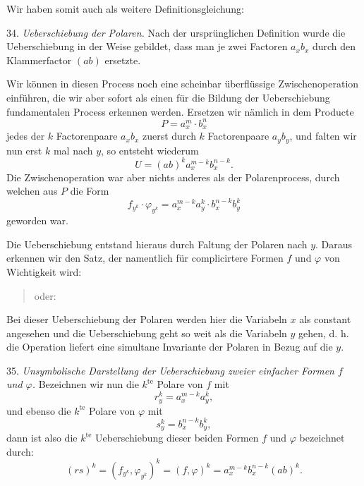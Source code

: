 
Wir haben somit auch als weitere Definitionsgleichung:


34. \textit{Ueberschiebung der Polaren.} Nach der ursprünglichen Definition
wurde die Ueberschiebung in der Weise gebildet, dass man je zwei Factoren
$a_x b_x$ durch den Klammerfactor $(ab)$ ersetzte.

Wir können in diesen Process noch eine scheinbar überflüssige
Zwischenoperation einführen, die wir aber sofort als einen für die
Bildung der Ueberschiebung fundamentalen Process erkennen werden.
Ersetzen wir nämlich in dem Producte
\[
P = a_x^m \cdot b_x^n
\]
jedes der $k$ Factorenpaare $a_x b_x$ zuerst durch $k$ Factorenpaare
$a_y b_y$, und falten wir nun erst $k$ mal nach $y$, so entsteht wiederum
\[
U = (ab)^k a_x^{m-k} b_x^{n-k}.
\]
Die Zwischenoperation war aber nichts anderes als der Polarenprocess,
durch welchen aus $P$ die Form
\[
f_{y^k} \cdot \varphi_{y^k} = a_x^{m-k} a_y^k \cdot b_x^{n-k} b_y^k
\]
geworden war.

Die Ueberschiebung entstand hieraus durch Faltung der Polaren nach $y$.
Daraus erkennen wir den Satz, der namentlich für complicirtere Formen $f$
und $\varphi$ von Wichtigkeit wird:

\begin{quote}
\glqq {}\grqq{}
oder:
\end{quote}


Bei dieser Ueberschiebung der Polaren werden hier die Variabeln $x$ als
constant angesehen und die Ueberschiebung geht so weit als die Variabeln
$y$ gehen, d. h. die Operation liefert eine simultane Invariante der
Polaren in Bezug auf die $y$.

35. \textit{Unsymbolische Darstellung der Ueberschiebung zweier einfacher
Formen $f$ und $\varphi$.} Bezeichnen wir nun die $k^{\text{te}}$ Polare
von $f$ mit
\[
r_y^k = a_x^{m-k} a_y^k,
\]
und ebenso die $k^{\text{te}}$ Polare von $\varphi$ mit
\[
s_y^k = b_x^{n-k} b_y^k,
\]
dann ist also die $k^{\text{te}}$ Ueberschiebung dieser beiden Formen $f$
und $\varphi$ bezeichnet durch:
\[
(rs)^k = (f_{y^k}, \varphi_{y^k})^k = (f, \varphi)^k = a_x^{m-k} b_x^{n-k} (ab)^k.
\]


